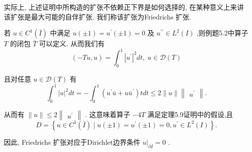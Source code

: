 \documentclass[lang=cn,newtx,10pt,scheme=chinese,thmcnt=chapter]{elegantbook}
\begin{document}
\begin{note}
     实际上, 上述证明中所构造的扩张不依赖正下界是如何选择的, 在某种意义上来讲该扩张是最大可能的自伴扩张. 我们称该扩张为Friedrichs 扩张.
\end{note}
\begin{example}
    若 \(u \in  {C}^{1}\left( \bar{I}\right)\) 中满足 \(u\left( {\pm 1}\right)  = {u}^{\prime }\left( {\pm 1}\right)  = 0\) 及 \({u}^{\prime \prime } \in  {L}^{2}\left( I\right)\) ,则例题5.2中算子 \(T\) 的闭包 \(\bar{T}\) 可以定义. 从而我们有
\begin{equation*}
\left( {-{Tu},u}\right)  = {\int }_{0}^{1}{\left| {u}^{\prime }\right| }^{2}{dt},\;u \in  \mathcal{D}(T)
\end{equation*}

且对任意 \(u \in  \mathcal{D}(T)\) 有
\begin{equation*}
{\int }_{0}^{1}{\left| u\right| }^{2}{dt} =  - {\int }_{0}^{1}\left( {{u}^{\prime }\bar{u} + u{\bar{u}}^{\prime }}\right) {tdt} \leq  2\parallel u\parallel \begin{Vmatrix}{u}^{\prime }\end{Vmatrix}.
\end{equation*}

从而有 \(\parallel u\parallel  \leq  2\begin{Vmatrix}{u}^{\prime }\end{Vmatrix}\) . 这意味着算子 \(- {4T}\) 满足定理5.9证明中的假设,且
\begin{equation*}
D = \left\{  {u \in  {C}^{1}\left( \bar{I}\right)  \mid  u\left( {\pm 1}\right)  = {u}^{\prime }\left( {\pm 1}\right)  = 0,{u}^{\prime } \in  {L}^{2}\left( I\right) }\right\}  .
\end{equation*}

因此, Friedrichs 扩张对应于Dirichlet边界条件 \({\left. u\right| }_{\partial I} = 0\) .

\end{example}
\end{document}

